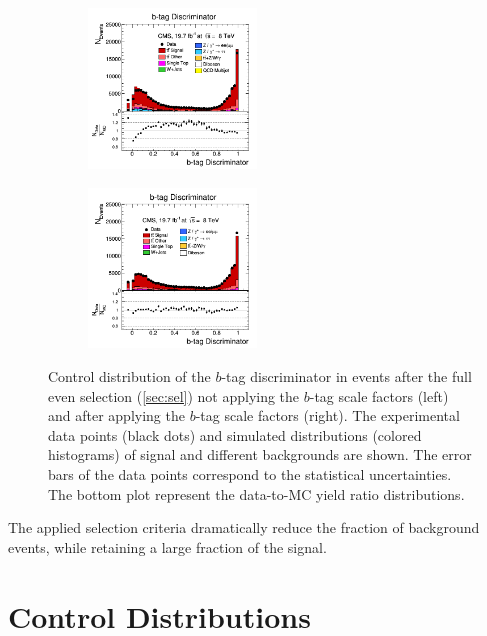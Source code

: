\begin{itemize}
 \begin{figure}[h]
 \centering
 \begin{subfigure}
   \centering
   \includegraphics[width=0.49\textwidth]{04_event_reconstruction/plots/bTagDiscr_step6.png}
 \end{subfigure}
 \begin{subfigure}
   \centering
   \includegraphics[width=0.49\textwidth]{04_event_reconstruction/plots/bTagDiscr_step7.png}
 \end{subfigure}
 \caption{Control distribution of the $b$-tag discriminator in events after the full even selection (\ref{sec:sel}) not applying the $b$-tag scale factors (left)
 and after applying the $b$-tag scale factors (right). The experimental data points (black dots)
 and simulated distributions (colored histograms) of signal and different backgrounds are shown. The error bars of the data points
 correspond to the statistical uncertainties. The bottom plot represent the data-to-MC yield ratio distributions.}
 \label{fig:bTagDiscr}
 \end{figure}
 \end{itemize}

The applied selection criteria dramatically reduce the fraction of background events, while retaining a large fraction of the signal.

\section{Control Distributions}


